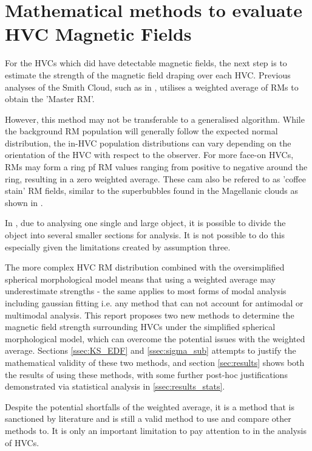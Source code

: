 \section{Mathematical methods to evaluate HVC Magnetic Fields}
\label{sec:evaluation}

For the HVCs which did have detectable magnetic fields, the next step is to estimate the strength of the magnetic field draping over each HVC. Previous analyses of the Smith Cloud, such as in \cite{ID5, ID26}, utilises a weighted average of RMs to obtain the 'Master RM'. 


However, this method may not be transferable to a generalised algorithm. While the background RM population will generally follow the expected normal distribution, the in-HVC population distributions can vary depending on the orientation of the HVC with respect to the observer. For more face-on HVCs, RMs may form a ring pf RM values ranging from positive to negative around the ring, resulting in a zero weighted average. These cam also be refered to as 'coffee stain' RM fields, similar to the superbubbles found in the Magellanic clouds as shown in \cite{ID75}.


In \cite{ID5, ID26}, due to analysing one single and large object, it is possible to divide the object into several smaller sections for analysis. It is not possible to do this especially given the limitations created by assumption three.


The more complex HVC RM distribution combined with the oversimplified spherical morphological model means that using a weighted average may underestimate strengths - the same applies to most forms of modal analysis including gaussian fitting i.e. any method that can not account for antimodal or multimodal analysis. This report proposes two new methods to determine the magnetic field strength surrounding HVCs under the simplified spherical morphological model, which can overcome the potential issues with the weighted average. Sections \ref{ssec:KS_EDF} and \ref{ssec:sigma_sub} attempts to justify the mathematical validity of these two methods, and section \ref{sec:results} shows both the results of using these methods, with some further post-hoc justifications demonstrated via statistical analysis in \ref{ssec:results_stats}.


Despite the potential shortfalls of the weighted average, it is a method that is sanctioned by literature and is still a valid method to use and compare other methods to. It is only an important limitation to pay attention to in the analysis of HVCs.


